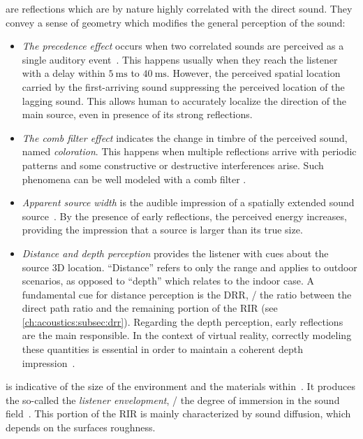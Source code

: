  are reflections which are by nature highly correlated with the direct sound.
They convey a sense of geometry which modifies the general perception of the sound:
\begin{itemize}
    \item \textit{The precedence effect} occurs when two correlated sounds are perceived as a single auditory event~.
    This happens usually when they reach the listener with a delay within $\SI{5}{\ms}$ to $\SI{40}{\ms}$.
    However, the perceived spatial location carried by the first-arriving sound suppressing the perceived location of the lagging sound.
    This allows human to accurately localize the direction of the main source, even in presence of its strong reflections.
    \item \textit{The comb filter effect} indicates the change in timbre of the perceived sound, named \textit{coloration}.
    This happens when multiple reflections arrive with periodic patterns and some constructive or destructive interferences arise.
    Such phenomena can be well modeled with a comb filter .
    \item \textit{Apparent source width} is the audible impression of a spatially extended sound source~.
    By the presence of early reflections, the perceived energy increases, providing the impression that a source is larger than its true size.
    \item \textit{Distance and depth perception} provides the listener with cues about the source 3D location.
    ``Distance'' refers to only the range and applies to outdoor scenarios, as opposed to ``depth'' which relates to the indoor case.
    A fundamental cue for distance perception is the \ac{DRR}, \ie/ the ratio between the direct path ratio and the remaining portion of the \ac{RIR} (see \cref{ch:acoustics:subsec:drr}).
    Regarding the depth perception, early reflections are the main responsible.
    In the context of virtual reality, correctly modeling these quantities is essential in order to maintain a coherent depth impression~.
\end{itemize}

 is indicative of the size of the environment and the materials within~.
It produces the so-called the \textit{listener envelopment}, \ie/ the degree of immersion in the sound field~.
This portion of the \ac{RIR} is mainly characterized by sound diffusion, which depends on the surfaces roughness.

